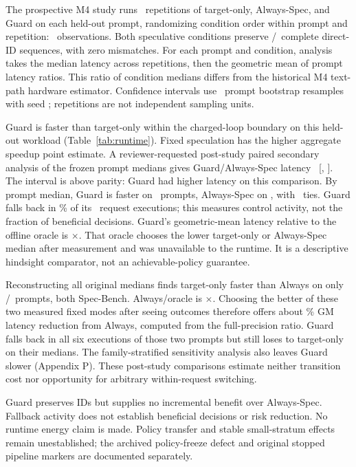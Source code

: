 The prospective M4 study runs \RTReps\ repetitions of target-only, Always-Spec, and Guard on each held-out prompt, randomizing condition order within prompt and repetition: \RTObservations\ observations. Both speculative conditions preserve \RTExact/\RTExact\ complete direct-ID sequences, with zero mismatches. For each prompt and condition, analysis takes the median latency across repetitions, then the geometric mean of prompt latency ratios. This ratio of condition medians differs from the historical M4 text-path hardware estimator. Confidence intervals use \RTBootstrap\ prompt bootstrap resamples with seed \RTSeed; repetitions are not independent sampling units.


Guard is faster than target-only within the charged-loop boundary on this held-out workload (Table~\ref{tab:runtime}). Fixed speculation has the higher aggregate speedup point estimate. A reviewer-requested post-study paired secondary analysis of the frozen prompt medians gives Guard/Always-Spec latency \RTSecondary\ [\RTSecondaryLo, \RTSecondaryHi]. The interval is above parity: Guard had higher latency on this comparison. By prompt median, Guard is faster on \RTGuardFaster\ prompts, Always-Spec on \RTAlwaysFaster, with \RTTies\ ties. Guard falls back in \RTFallback\% of its \RTExact\ request executions; this measures control activity, not the fraction of beneficial decisions. Guard's geometric-mean latency relative to the offline oracle is \RTOracle$\times$. That oracle chooses the lower target-only or Always-Spec median after measurement and was unavailable to the runtime. It is a descriptive hindsight comparator, not an achievable-policy guarantee.

Reconstructing all original medians finds target-only faster than Always on only \DerTargetFaster/\RTPrompts\ prompts, both Spec-Bench. Always/oracle is \DerAlwaysOracle$\times$. Choosing the better of these two measured fixed modes after seeing outcomes therefore offers about \DiagMOpportunity\% GM latency reduction from Always, computed from the full-precision ratio. Guard falls back in all six executions of those two prompts but still loses to target-only on their medians. The family-stratified sensitivity analysis also leaves Guard slower (Appendix P). These post-study comparisons estimate neither transition cost nor opportunity for arbitrary within-request switching.

Guard preserves IDs but supplies no incremental benefit over Always-Spec. Fallback activity does not establish beneficial decisions or risk reduction. No runtime energy claim is made. Policy transfer and stable small-stratum effects remain unestablished; the archived policy-freeze defect and original stopped pipeline markers are documented separately.
